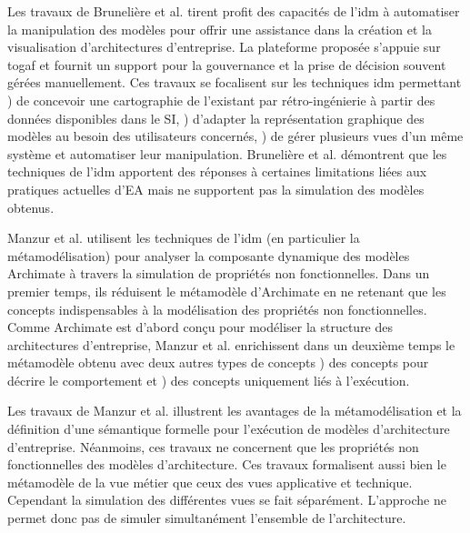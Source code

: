 Les travaux de Brunelière et al. \cite{bruneliere2013mde} tirent profit des capacités de l'\gls{idm} à automatiser la manipulation des modèles pour offrir une assistance dans la création et la visualisation d'architectures d'entreprise. La plateforme proposée s'appuie sur \gls{togaf} et fournit un support pour la gouvernance et la prise de décision souvent gérées manuellement. Ces travaux se focalisent sur les techniques \gls{idm} permettant \primo\!) de concevoir une cartographie de l'existant par rétro-ingénierie à partir des données disponibles dans le SI, \secundo\!) d'adapter la représentation graphique des modèles au besoin des utilisateurs concernés, \tertio\!) de gérer plusieurs vues d'un même système et automatiser leur manipulation. Brunelière et al. \cite{bruneliere2013mde} démontrent que les techniques de l'\gls{idm} apportent des réponses à certaines limitations liées aux pratiques actuelles d'EA mais ne supportent pas la simulation des modèles obtenus. 

Manzur et al. \cite{manzur2015xarchimate} utilisent les techniques de l'\gls{idm} (en particulier la métamodélisation) pour analyser la composante dynamique des modèles Archimate à travers la simulation de propriétés non fonctionnelles. Dans un premier temps, ils réduisent le métamodèle  d'Archimate en ne retenant que les concepts indispensables à la modélisation des propriétés non fonctionnelles. Comme Archimate est d'abord conçu pour modéliser la structure des architectures d'entreprise, Manzur et al. \cite{manzur2015xarchimate} enrichissent dans un deuxième temps le métamodèle obtenu avec deux autres types de concepts \primo\!) des concepts pour décrire le comportement et \secundo\!) des concepts uniquement liés à l'exécution. 

Les travaux de Manzur et al. \cite{manzur2015xarchimate} illustrent les avantages de la métamodélisation et la définition d'une sémantique formelle pour l'exécution de modèles d'architecture d'entreprise. Néanmoins, ces travaux ne concernent que les propriétés non fonctionnelles des modèles d'architecture. Ces travaux formalisent aussi bien le métamodèle de la vue métier que ceux des vues applicative et technique. Cependant la simulation des différentes vues se fait séparément. L'approche ne permet donc pas de simuler simultanément l'ensemble de l'architecture. 


%
%
%
%
%
%
%



